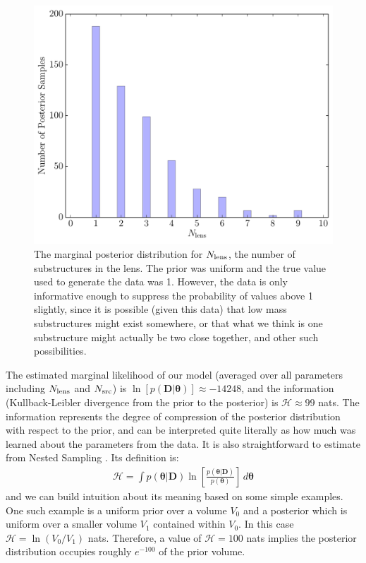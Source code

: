 \documentclass[useAMS,usenatbib]{mn2e}
\begin{document}
\begin{figure}
\begin{center}
\includegraphics[scale=0.4]{N_lens.pdf}
\caption{The marginal posterior distribution for $N_{\rm lens}$, the
number of substructures in the lens. The prior was uniform and the true
value used to generate the data was 1. However, the data is only informative
enough to suppress the probability of values above 1 slightly, since it
is possible (given this data) that low mass substructures might exist somewhere,
or that what we think is one substructure might actually be two close together,
and other such possibilities.
\label{fig:N_lens}}
\end{center}
\end{figure}

The estimated marginal likelihood of our model
(averaged over all parameters including $N_{\rm lens}$ and $N_{\rm src}$)
is
$\ln\left[p(\boldsymbol{D} | \boldsymbol{\theta})\right] \approx -14248$, and
the information (Kullback-Leibler divergence from the prior to the posterior)
is $\mathcal{H} \approx 99$ nats. The information represents the degree of
compression of the posterior distribution with respect to the prior, and can
be interpreted quite literally as how much was learned about the parameters from
the data. It is also straightforward to estimate from Nested Sampling
\citep{skilling}. Its definition is:
\begin{eqnarray}
\mathcal{H} = \int p(\boldsymbol{\theta} | \boldsymbol{D})
\ln\left[\frac{p(\boldsymbol{\theta} | \boldsymbol{D})}{p(\boldsymbol{\theta})}\right]
\, d\boldsymbol{\theta}
\end{eqnarray}
and we can build intuition about its meaning based on some simple examples. One
such example is a uniform prior over a volume $V_0$ and a posterior which is
uniform over a smaller volume $V_1$ contained within $V_0$. In this case
$\mathcal{H} = \ln(V_0/V_1)$ nats. Therefore, a value of $\mathcal{H}=100$ nats
implies the posterior distribution occupies roughly $e^{-100}$ of the prior
volume.
\end{document}

